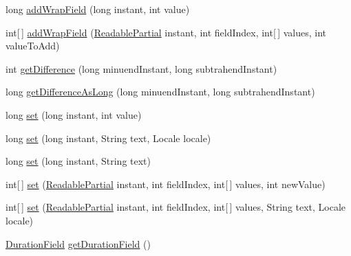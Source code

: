 \begin{DoxyCompactItemize}
\item 
long \hyperlink{classorg_1_1joda_1_1time_1_1field_1_1_delegated_date_time_field_ad3d187e94791a78808d5482485502e17}{add\-Wrap\-Field} (long instant, int value)
\item 
int\mbox{[}$\,$\mbox{]} \hyperlink{classorg_1_1joda_1_1time_1_1field_1_1_delegated_date_time_field_aa2a02b3ebb571d7d1987b99684e5a575}{add\-Wrap\-Field} (\hyperlink{interfaceorg_1_1joda_1_1time_1_1_readable_partial}{Readable\-Partial} instant, int field\-Index, int\mbox{[}$\,$\mbox{]} values, int value\-To\-Add)
\item 
int \hyperlink{classorg_1_1joda_1_1time_1_1field_1_1_delegated_date_time_field_ae2884e56a894783a46a22a7e2116b2d0}{get\-Difference} (long minuend\-Instant, long subtrahend\-Instant)
\item 
long \hyperlink{classorg_1_1joda_1_1time_1_1field_1_1_delegated_date_time_field_a3d01b4bee0474000331955da96599952}{get\-Difference\-As\-Long} (long minuend\-Instant, long subtrahend\-Instant)
\item 
long \hyperlink{classorg_1_1joda_1_1time_1_1field_1_1_delegated_date_time_field_ac8c71ae2bf565cc8ebcf71ddd4b4053f}{set} (long instant, int value)
\item 
long \hyperlink{classorg_1_1joda_1_1time_1_1field_1_1_delegated_date_time_field_a3d12c82793d6870fda32f2e8d48c2f00}{set} (long instant, String text, Locale locale)
\item 
long \hyperlink{classorg_1_1joda_1_1time_1_1field_1_1_delegated_date_time_field_ac9f51268db57d544b409b18c672676a4}{set} (long instant, String text)
\item 
int\mbox{[}$\,$\mbox{]} \hyperlink{classorg_1_1joda_1_1time_1_1field_1_1_delegated_date_time_field_aea3e7129172f44208ef3b8e4585dd676}{set} (\hyperlink{interfaceorg_1_1joda_1_1time_1_1_readable_partial}{Readable\-Partial} instant, int field\-Index, int\mbox{[}$\,$\mbox{]} values, int new\-Value)
\item 
int\mbox{[}$\,$\mbox{]} \hyperlink{classorg_1_1joda_1_1time_1_1field_1_1_delegated_date_time_field_a0d1a00b6ab3c5b63515ba31a2e23dd74}{set} (\hyperlink{interfaceorg_1_1joda_1_1time_1_1_readable_partial}{Readable\-Partial} instant, int field\-Index, int\mbox{[}$\,$\mbox{]} values, String text, Locale locale)
\item 
\hyperlink{classorg_1_1joda_1_1time_1_1_duration_field}{Duration\-Field} \hyperlink{classorg_1_1joda_1_1time_1_1field_1_1_delegated_date_time_field_ae446fa61cb450681221e947647d360ab}{get\-Duration\-Field} ()
\item 

\end{DoxyCompactItemize}
